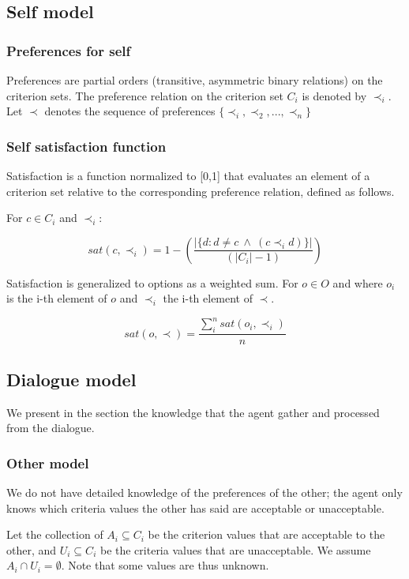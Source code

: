 \documentclass{llncs}
\begin{document}
				
				\subsection{Self model} 
				
				\subsubsection{Preferences for self}
				Preferences are partial orders (transitive, asymmetric binary relations) on the criterion sets. The preference relation on the criterion set $C_i$ is denoted by $\prec_i$.			
				Let $\prec$ denotes the sequence of preferences $\{ \prec_i, \prec_2, ..., \prec_n\}$
				
				\subsubsection{Self satisfaction function} 
				
				Satisfaction is a function normalized to [0,1] that evaluates an element of a criterion set relative to the corresponding preference relation, defined as follows.
				
				For $c \in C_i$ and $\prec_i$:
				
				$$sat(c, \prec_i) =	1 - \left( \frac{|\{d : d \neq c \  \wedge \ (c \prec_i d)\}| }{( |C_i| - 1 )}\right)  $$
				
				Satisfaction is generalized to options as a weighted sum.
				For $o \in O$ and where $o_i$ is the i-th element of $o$ and $\prec_i$ the i-th element of $\prec$.
				
				$$sat(o, \prec) = \frac{\sum_{i}^{n} sat(o_i, \prec_i) }{n} $$
				
				
				\subsection{Dialogue model}
				We present in the section the knowledge that the agent gather and processed from the dialogue.
				
				\subsubsection{Other model}
				We do not have detailed knowledge of the preferences of the other; the agent only knows which criteria values the other has said are acceptable or unacceptable.
				
				Let the collection of $A_i \subseteq C_i$ be the criterion values that are acceptable to the other, and $U_i \subseteq C_i$ be the criteria values that are unacceptable.  We assume $A_i \cap U_i = \emptyset$.  Note	that some values are thus unknown.
				
\end{document}
